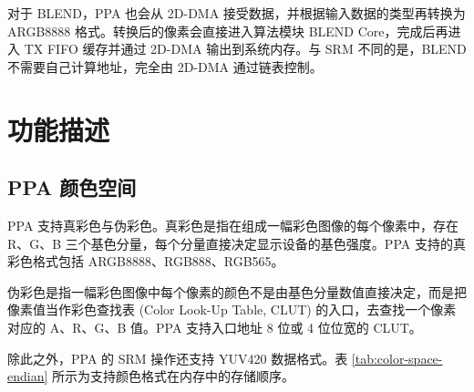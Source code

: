 \documentclass[main\_\_CN.tex]{subfiles}
\begin{document}
对于 BLEND，PPA 也会从 2D-DMA 接受数据，并根据输入数据的类型再转换为 ARGB8888 格式。转换后的像素会直接进入算法模块 BLEND Core，完成后再进入 TX FIFO 缓存并通过 2D-DMA 输出到系统内存。与 SRM 不同的是，BLEND 不需要自己计算地址，完全由 2D-DMA 通过链表控制。



\section{功能描述}
\label{sec:ppa-func-descr}

\subsection{PPA 颜色空间}

PPA 支持真彩色与伪彩色。真彩色是指在组成一幅彩色图像的每个像素中，存在 R、G、B 三个基色分量，每个分量直接决定显示设备的基色强度。PPA 支持的真彩色格式包括 ARGB8888、RGB888、RGB565。

伪彩色是指一幅彩色图像中每个像素的颜色不是由基色分量数值直接决定，而是把像素值当作彩色查找表 (Color Look-Up Table, CLUT) 的入口，去查找一个像素对应的 A、R、G、B 值。PPA 支持入口地址 8 位或 4 位位宽的 CLUT。

除此之外，PPA 的 SRM 操作还支持 YUV420 数据格式。表 \ref{tab:color-space-endian} 所示为支持颜色格式在内存中的存储顺序。
\end{document}

